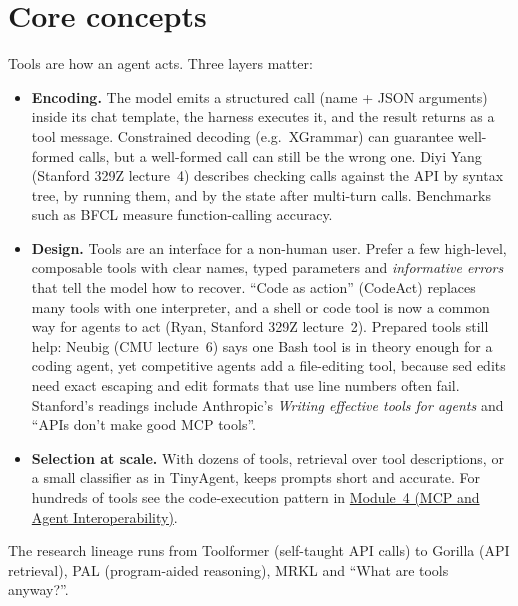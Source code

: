 \documentclass[10pt,oneside]{report}
\begin{document}
\section{Core concepts}
Tools are how an agent acts. Three layers matter:
\begin{itemize}
\item \textbf{Encoding.} The model emits a structured call (name + JSON arguments) inside its chat template, the harness executes it, and the result returns as a tool message. Constrained decoding (e.g.\ XGrammar) can guarantee well-formed calls, but a well-formed call can still be the wrong one. Diyi Yang (Stanford 329Z lecture~4) describes checking calls against the API by syntax tree, by running them, and by the state after multi-turn calls. Benchmarks such as BFCL measure function-calling accuracy.
\item \textbf{Design.} Tools are an interface for a non-human user. Prefer a few high-level, composable tools with clear names, typed parameters and \emph{informative errors} that tell the model how to recover. ``Code as action'' (CodeAct) replaces many tools with one interpreter, and a shell or code tool is now a common way for agents to act (Ryan, Stanford 329Z lecture~2). Prepared tools still help: Neubig (CMU lecture~6) says one Bash tool is in theory enough for a coding agent, yet competitive agents add a file-editing tool, because sed edits need exact escaping and edit formats that use line numbers often fail. Stanford's readings include Anthropic's \emph{Writing effective tools for agents} and ``APIs don't make good MCP tools''.
\item \textbf{Selection at scale.} With dozens of tools, retrieval over tool descriptions, or a small classifier as in TinyAgent, keeps prompts short and accurate. For hundreds of tools see the code-execution pattern in \hyperlink{mod-MCP}{Module~4 (MCP and Agent Interoperability)}.
\end{itemize}
The research lineage runs from Toolformer (self-taught API calls) to Gorilla (API retrieval), PAL (program-aided reasoning), MRKL and ``What are tools anyway?''.
\end{document}
